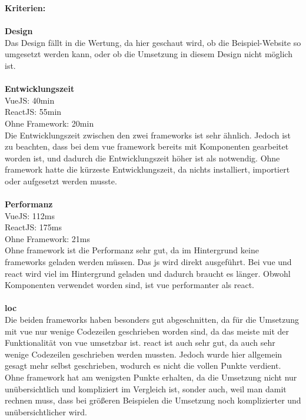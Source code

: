 \textbf{Kriterien:}\\\\
\textbf{Design}\\
Das Design fällt in die Wertung, da hier geschaut wird, ob die Beispiel-Website so umgesetzt werden kann, oder ob die Umsetzung in diesem Design nicht möglich ist.\\\\
\textbf{Entwicklungszeit}\\
VueJS: 40min\\
ReactJS: 55min\\
Ohne Framework: 20min\\
Die Entwicklungszeit zwischen den zwei \Gls{framework}s ist sehr ähnlich. Jedoch ist zu beachten, dass bei dem \Gls{vue} \Gls{framework} bereits mit Komponenten gearbeitet worden ist, und dadurch die Entwicklungszeit höher ist als notwendig. Ohne \Gls{framework} hatte die kürzeste Entwicklungszeit, da nichts installiert, importiert oder aufgesetzt werden musste.\\\\
\textbf{Performanz}\\
VueJS: 112ms\\
ReactJS: 175ms\\
Ohne Framework: 21ms\\
Ohne \Gls{framework} ist die Performanz sehr gut, da im Hintergrund keine \Gls{framework}s geladen werden müssen. Das \Gls{js} wird direkt ausgeführt. Bei \Gls{vue} und \Gls{react} wird viel im Hintergrund geladen und dadurch braucht es länger. Obwohl Komponenten verwendet worden sind, ist \Gls{vue} performanter als \Gls{react}.\\\\
\textbf{\Gls{loc}}\\
Die beiden \Gls{framework}s haben besonders gut abgeschnitten, da für die Umsetzung mit \Gls{vue} nur wenige Codezeilen geschrieben worden sind, da das meiste mit der Funktionalität von \Gls{vue} umsetzbar ist. \Gls{react} ist auch sehr gut, da auch sehr wenige Codezeilen geschrieben werden mussten. Jedoch wurde hier allgemein gesagt mehr selbst geschrieben, wodurch es nicht die vollen Punkte verdient. Ohne \Gls{framework} hat am wenigsten Punkte erhalten, da die Umsetzung nicht nur unübersichtlich und kompliziert im Vergleich ist, sonder auch, weil man damit rechnen muss, dass bei größeren Beispielen die Umsetzung noch komplizierter und unübersichtlicher wird.
